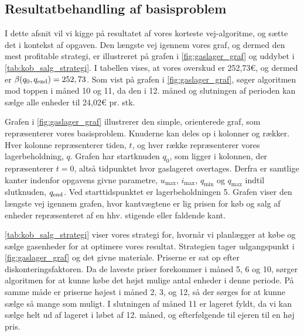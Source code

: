 \subsection{Resultatbehandling af basisproblem}

I dette afsnit vil vi kigge på resultatet af vores korteste vej-algoritme, og sætte det i kontekst af opgaven. Den længste vej igennem vores graf, og dermed den mest profitable strategi, er illustreret på grafen i \autoref{fig:gaslager_graf} og uddybet i \autoref{tab:kob_salg_strategi}. I tabellen vises, at vores overskud er 252,73€, og dermed er $\beta (q_0, q_{\textrm{end}}) = 252,73$. Som vist på grafen i \autoref{fig:gaslager_graf}, søger algoritmen mod toppen i måned 10 og 11, da den i 12. måned og slutningen af perioden kan sælge alle enheder til 24,02€ pr. stk. 



Grafen i \autoref{fig:gaslager_graf} illustrerer den simple, orienterede graf, som repræsenterer vores basisproblem. Knuderne kan deles op i kolonner og rækker. Hver kolonne repræsenterer tiden, $t$, og hver række repræsenterer vores lagerbeholdning, $q$. Grafen har startknuden $q_0$, som ligger i kolonnen, der repræsenterer $t=0$, altså tidpunktet hvor gaslageret overtages. Derfra er samtlige kanter indenfor opgavens givne parametre, $u_{\max }$, $i_{\max }$, $q_{\min }$ og $q_{\max }$ indtil slutknuden, $q_{\textrm{end}}$. Ved starttidspunktet er lagerbeholdningen 5. Grafen viser den længste vej igennem grafen, hvor kantvægtene er lig prisen for køb og salg af enheder repræsenteret af en hhv. stigende eller faldende kant.



\autoref{tab:kob_salg_strategi} viser vores strategi for, hvornår vi planlægger at købe og sælge gasenheder for at optimere vores resultat. Strategien tager udgangspunkt i \autoref{fig:gaslager_graf} og det givne materiale. Priserne er sat op efter diskonteringsfaktoren.%
 Da de laveste priser forekommer i måned 5, 6 og 10, sørger algoritmen for at kunne købe det højst mulige antal enheder i denne periode. På samme måde er priserne højest i måned 2, 3, og 12, så der sørges for at kunne sælge så mange som muligt. I slutningen af måned 11 er lageret fyldt, da vi kan sælge helt ud af lageret i løbet af 12. måned, og efterfølgende til ejeren til en høj pris.
